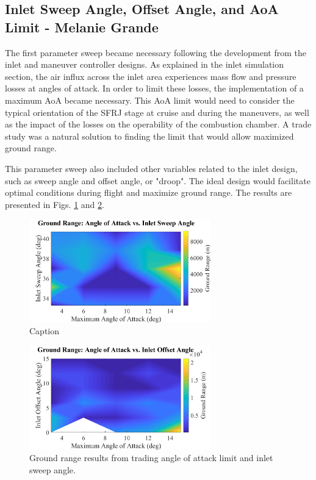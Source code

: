 \subsection{Inlet Sweep Angle, Offset Angle, and AoA Limit - Melanie Grande}
The first parameter sweep became necessary following the  development from the inlet and maneuver controller designs. As explained in the inlet simulation section, the air influx across the inlet area experiences mass flow and pressure losses at angles of attack. In order to limit these losses, the implementation of a maximum AoA became necessary. This AoA limit would need to consider the typical orientation of the SFRJ stage at cruise and during the maneuvers, as well as the impact of the losses on the operability of the combustion chamber. A trade study was a natural solution to finding the limit that would allow maximized ground range.

This parameter sweep also included other variables related to the inlet design, such as sweep angle and offset angle, or "droop". The ideal design would facilitate optimal conditions during flight and maximize ground range. The results are presented in Figs. \ref{fig:aoaVsSweep} and \ref{fig:aoaVsOffset}. 

\begin{figure}[H]
    \centering
    \includegraphics[width=0.7\textwidth]{ParameterSweeps/figures/RangevsAoAvsSweep.png}
    \caption{Caption}
    \label{fig:aoaVsSweep}
\end{figure}

\begin{figure}[H]
    \centering
    \includegraphics[width=0.7\textwidth]{ParameterSweeps/figures/RangevsAoAvsOffset.png}
    \caption{Ground range results from trading angle of attack limit and inlet sweep angle.}
    \label{fig:aoaVsOffset}
\end{figure}

